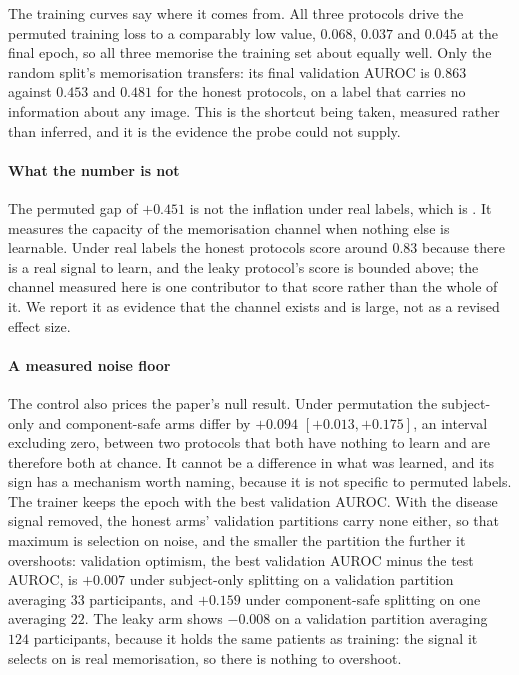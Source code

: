 \documentclass[11pt]{article}
\begin{document}
The training curves say where it comes from. All three protocols drive the
permuted training loss to a comparably low value, $0.068$, $0.037$ and
$0.045$ at the final epoch, so all three memorise the training set about
equally well. Only the random split's memorisation transfers: its final
validation AUROC is $0.863$ against $0.453$ and $0.481$ for the honest
protocols, on a label that carries no information about any image. This is
the shortcut being taken, measured rather than inferred, and it is the
evidence the probe could not supply.

\paragraph{What the number is not}
The permuted gap of $+0.451$ is not the inflation under real labels, which
is \AdniGapTotal{}. It measures the capacity of the memorisation channel
when nothing else is learnable. Under real labels the honest protocols
score around $0.83$ because there is a real signal to learn, and the leaky
protocol's score is bounded above; the channel measured here is one
contributor to that score rather than the whole of it. We report it as
evidence that the channel exists and is large, not as a revised effect
size.

\paragraph{A measured noise floor}
The control also prices the paper's null result. Under permutation the
subject-only and component-safe arms differ by $+0.094$
$[+0.013, +0.175]$, an interval excluding zero, between two protocols that
both have nothing to learn and are therefore both at chance. It cannot
be a difference in what was learned, and its sign has a mechanism worth
naming, because it is not specific to permuted labels. The trainer keeps
the epoch with the best validation AUROC. With the disease signal
removed, the honest arms' validation partitions carry none either, so
that maximum is selection on noise, and the smaller the partition the
further it overshoots: validation optimism, the best validation AUROC
minus the test AUROC, is $+0.007$ under subject-only splitting on a
validation partition averaging $33$ participants, and $+0.159$ under
component-safe splitting on one averaging $22$. The leaky arm shows
$-0.008$ on a validation partition averaging $124$ participants, because
it holds the same patients as training: the signal it selects on is real
memorisation, so there is nothing to overshoot.
\end{document}
